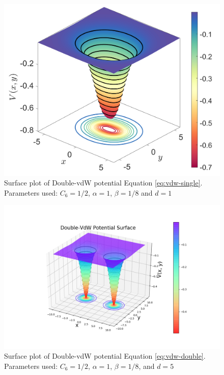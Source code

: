 \documentclass[10pt,aps,onecolumn,superscriptaddress]{revtex4-2}
\begin{document}
\begin{figure}
    \centering
    \includegraphics[scale=0.3]{untitled.png}
    \caption{Surface plot of Double-vdW potential Equation \eqref{eq:vdw-single}. Parameters used: $C_6 = 1/2$, $\alpha = 1$, $\beta = 1/8$ and $d = 1$}
    \label{fig:vdw-single_surface}
\end{figure}


\begin{figure}
    \centering
    \includegraphics[scale=0.5]{notebooks/figures/double-vdw_surface.png}
    \caption{Surface plot of Double-vdW potential Equation \eqref{eq:vdw-double}. Parameters used: $C_6 = 1/2$, $\alpha = 1$, $\beta = 1/8$, and  $d = 5$ }
    \label{fig:vdw-double_surface}
\end{figure}
\end{document}
